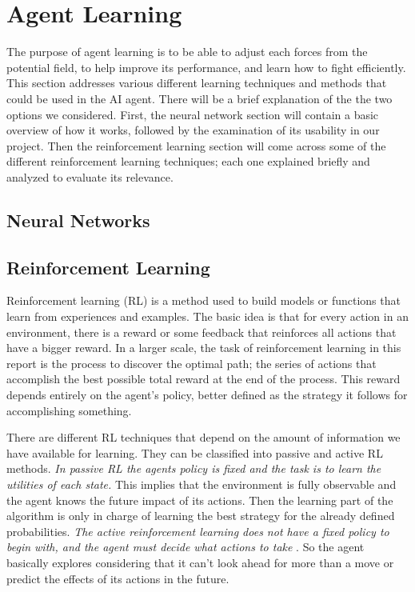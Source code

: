 \section{Agent Learning}\label{agent_learning}
The purpose of agent learning is to be able to adjust each forces from the potential field, to help improve its performance, and learn how to fight efficiently.
This section addresses various different learning techniques and methods that could be used in the AI agent. There will be a brief explanation of the the two options we considered. First, the neural network section will contain a basic overview of how it works, followed by the examination of its usability in our project. Then the reinforcement learning section will come across some of the different reinforcement learning techniques;  each one explained briefly and analyzed to evaluate its relevance. \\

\subsection*{Neural Networks}


\subsection*{Reinforcement Learning}
Reinforcement learning (RL) is a method used to build models or functions that learn from experiences and examples. The basic idea is that for every action in an environment, there is a reward or some feedback that reinforces all actions that have a bigger reward. In a larger scale, the task of reinforcement learning in this report is the process to discover the optimal path; the series of actions that accomplish the best possible total reward at the end of the process. This reward depends entirely on the agent's policy, better defined as the strategy it follows for accomplishing something. 

There are different RL techniques that depend on the amount of information we have available for learning. They can be classified into passive and active RL methods. \textit{In passive RL the agents policy is fixed and the task is to learn the utilities of each state.} \cite[p764]{rl} This implies that the environment is fully observable and the agent knows the future impact of its actions. Then the learning part of the algorithm is only in charge of learning the best strategy for the already defined probabilities. \textit{The active reinforcement learning does not have a fixed policy to begin with, and the agent must decide what actions to take} \cite[p771]{rl}. So the agent basically explores considering that it can't look ahead for more than a move or predict the effects of its actions in the future.

